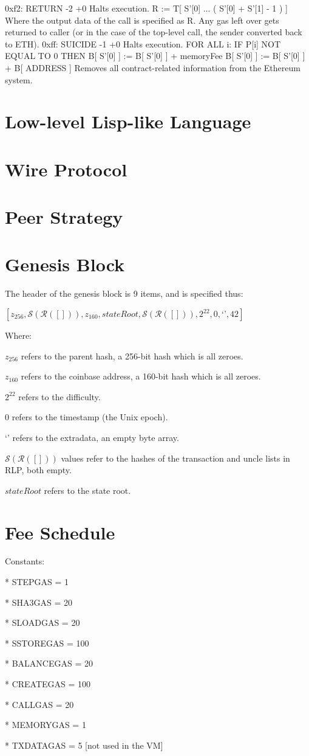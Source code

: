 \documentclass[9pt,oneside]{amsart}
\begin{document}
\begin{multicols}{2}
0xf2: RETURN -2 +0
Halts execution.
R := T[ S'[0] ... ( S'[0] + S'[1] - 1 ) ]
Where the output data of the call is specified as R.
Any gas left over gets returned to caller (or in the case of the top-level call, the sender converted back to ETH).
0xff: SUICIDE -1 +0
Halts execution.
FOR ALL i: IF P[i] NOT EQUAL TO 0 THEN B[ S'[0] ] := B[ S'[0] ] + memoryFee
B[ S'[0] ] := B[ S'[0] ] + B[ ADDRESS ]
Removes all contract-related information from the Ethereum system.

\section{Low-level Lisp-like Language}\label{app:lll}

\section{Wire Protocol}\label{app:wire}

\section{Peer Strategy}\label{app:peers}

\section{Genesis Block}\label{app:genesis}

The header of the genesis block is 9 items, and is specified thus:

$[z_{256}, \mathcal{S}(\mathcal{R}([])), z_{160}, stateRoot, \mathcal{S}(\mathcal{R}([])), 2^{22}, 0, \text{`'}, 42]$

Where:

$z_{256}$ refers to the parent hash, a 256-bit hash which is all zeroes.

$z_{160}$ refers to the coinbase address, a 160-bit hash which is all zeroes.

$2^{22}$ refers to the difficulty.

0 refers to the timestamp (the Unix epoch).

`' refers to the extradata, an empty byte array.

$\mathcal{S}(\mathcal{R}([]))$ values refer to the hashes of the transaction and uncle lists in RLP, both empty.

$stateRoot$ refers to the state root.

\section{Fee Schedule}\label{app:fees}

Constants:

* STEPGAS = 1

* SHA3GAS = 20

* SLOADGAS = 20

* SSTOREGAS = 100

* BALANCEGAS = 20

* CREATEGAS = 100

* CALLGAS = 20

* MEMORYGAS = 1

* TXDATAGAS = 5 [not used in the VM]

\end{multicols}
\end{document}
